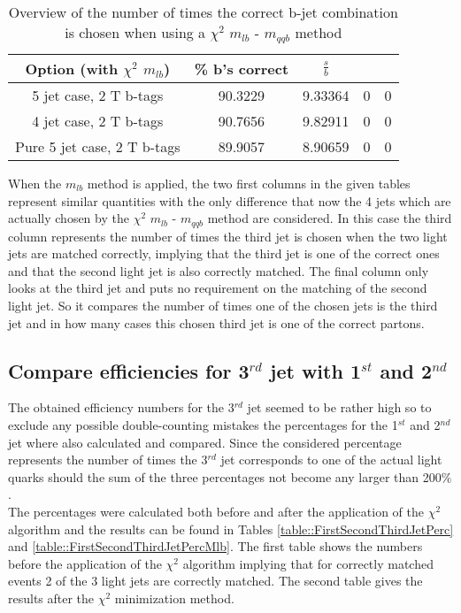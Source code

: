 \documentclass[a4paper,12pt]{report}
\begin{document}
 \begin{table}[!h] 
 \begin{tabular}{c|c|c|c|c} 
 \textbf{Option} (with $\chi^{2}$ $m_{lb}$) & \% b's correct   & $\frac{s}{b}$ &  &  \\ \hline 
 5 jet case,      2 T b-tags              & 90.3229 & 9.33364 & 0 & 0 \\ 
 4 jet case,      2 T b-tags              & 90.7656 & 9.82911 & 0 & 0 \\ 
 Pure 5 jet case, 2 T b-tags              & 89.9057 & 8.90659 & 0 & 0 \\ 
 \end{tabular} 
 \caption{Overview of the number of times the correct b-jet combination is chosen when using a $\chi^{2}$ $m_{lb}$ - $m_{qqb}$ method} 
 \end{table} 
When the $m_{lb}$ method is applied, the two first columns in the given tables represent similar quantities with the only difference that now the 4 jets which are actually chosen by the $\chi^{2}$ $m_{lb}$ - $m_{qqb}$ method are considered. 
In this case the third column represents the number of times the third jet is chosen when the two light jets are matched correctly, implying that the third jet is one of the correct ones and that the second light jet is also correctly matched. The final column only looks at the third jet and puts no requirement on the matching of the second light jet. So it compares the number of times one of the chosen jets is the third jet and in how many cases this chosen third jet is one of the correct partons.

\subsection{Compare efficiencies for 3$^{rd}$ jet with 1$^{st}$ and 2$^{nd}$}
The obtained efficiency numbers for the 3$^{rd}$ jet seemed to be rather high so to exclude any possible double-counting mistakes the percentages for the 1$^{st}$ and 2$^{nd}$ jet where also calculated and compared. Since the considered percentage represents the number of times the 3$^{rd}$ jet corresponds to one of the actual light quarks should the sum of the three percentages not become any larger than 200$\%$.\\
The percentages were calculated both before and after the application of the $\chi^{2}$ algorithm and the results can be found in Tables \ref{table::FirstSecondThirdJetPerc} and \ref{table::FirstSecondThirdJetPercMlb}. The first table shows the numbers before the application of the $\chi^{2}$ algorithm implying that for correctly matched events 2 of the 3 light jets are correctly matched. The second table gives the results after the $\chi^2$ minimization method.
\end{document}
